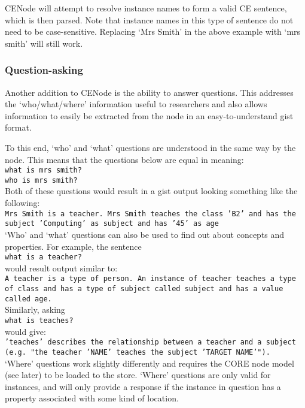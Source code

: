 \documentclass{scrartcl}
\begin{document}
CENode will attempt to resolve instance names to form a valid CE sentence, which is then parsed. Note that instance names in this type of sentence do not need to be case-sensitive. Replacing `Mrs Smith' in the above example with `mrs smith' will still work.\\

\subsubsection{Question-asking}

Another addition to CENode is the ability to answer questions. This addresses the `who/what/where' information useful to researchers and also allows information to easily be extracted from the node in an easy-to-understand gist format.

To this end, `who' and `what' questions are understood in the same way by the node. This means that the questions below are equal in meaning:\\
\texttt{what is mrs smith?}\\
\texttt{who is mrs smith?}\\

Both of these questions would result in a gist output looking something like the following:\\
\texttt{Mrs Smith is a teacher. Mrs Smith teaches the class 'B2' and has the subject 'Computing' as subject and has '45' as age}\\

`Who' and `what' questions can also be used to find out about concepts and properties. For example, the sentence\\
\texttt{what is a teacher?}\\
would result output similar to:\\
\texttt{A teacher is a type of person. An instance of teacher teaches a type of class and has a type of subject called subject and has a value called age.}\\

Similarly, asking\\
\texttt{what is teaches?}\\
would give:\\
\texttt{'teaches' describes the relationship between a teacher and a subject (e.g. "the teacher 'NAME' teaches the subject 'TARGET NAME'").}\\

`Where' questions work slightly differently and requires the CORE node model (see later) to be loaded to the store. `Where' questions are only valid for instances, and will only provide a response if the instance in question has a property associated with some kind of location.
\end{document}
